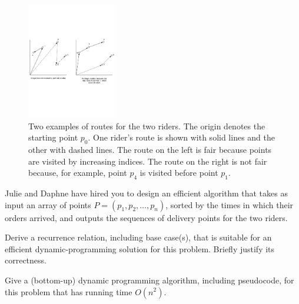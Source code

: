 \documentclass[11pt,addpoints]{exam}
\begin{document}
\begin{questions}
  \begin{figure}
    \centering
    \includegraphics[height=2in]{WheelDeliver.pdf}
    \caption{Two examples of routes for the two riders.  The origin denotes the starting point $p_0$.  One rider's route is shown with solid lines and the other with dashed lines.  The route on the left is fair because points are visited by increasing indices.  The route on the right is not fair because, for example, point $p_4$  is visited before point $p_1$.}
  \end{figure}

  Julie and Daphne have hired you to design an efficient algorithm that takes as input an array of points $P = (p_1,p_2,\dots, p_n)$, sorted by the times in which their orders arrived, and outputs the sequences of delivery points for the two riders.

  \begin{parts}
      \bonuspart[4] Derive a recurrence relation, including base case(s), that is suitable for an efficient dynamic-programming solution for this problem.
      Briefly justify its correctness.
      
      \begin{solution}
          
      \end{solution}
      
      \bonuspart[4] Give a (bottom-up) dynamic programming algorithm, including pseudocode, for this problem that has running time $O(n^2)$.
      
      \begin{solution}
          
      \end{solution}
  \end{parts}

\end{questions}
\end{document}
